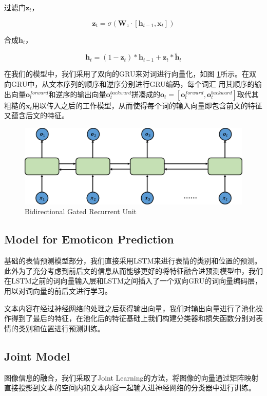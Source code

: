 \documentclass[10pt, titlepage]{article}
\begin{document}
过滤门$\textbf{z}_t$，

$$\textbf{z}_t = \sigma(\textbf{W}_z \cdot [\textbf{h}_{t-1},\textbf{x}_t])$$

合成$\textbf{h}_t$，

$$\textbf{h}_t = (1 - \textbf{z}_t) * \textbf{h}_{t-1} + \textbf{z}_t * \tilde{\textbf{h}}_t$$

在我们的模型中，我们采用了双向的GRU来对词进行向量化，如图 \ref{fig:bi-gru}所示。在双向GRU中，从文本序列的顺序和逆序分别进行GRU编码，每个词汇
用其顺序的输出向量$\textbf{o}^{forward}_t$和逆序的输出向量$\textbf{o}^{backward}_t$拼凑成的$\textbf{o}_t = [\textbf{o}^{forward}_t, \textbf{o}^{backward}_t]$取代其粗糙的$\textbf{x}_t$用以传入之后的工作模型，从而使得每个词的输入向量即包含前文的特征又蕴含后文的特征。

		\begin{figure}[htb]
		\centering
		\includegraphics[width=0.8\columnwidth]{figs/bi-gru.png}
		\caption{Bidirectional Gated Recurrent Unit}
		\label{fig:bi-gru}
		\end{figure}


\subsection{Model for Emoticon Prediction}

基础的表情预测模型部分，我们直接采用LSTM来进行表情的类别和位置的预测。此外为了充分考虑到前后文的信息从而能够更好的将特征融合进预测模型中，我们在LSTM之前的词向量输入层和LSTM之间插入了一个双向GRU的词向量编码层，用以对词向量的前后文进行学习。

文本内容在经过神经网络的处理之后获得输出向量，我们对输出向量进行了池化操作得到了最后的特征，在池化后的特征基础上我们构建分类器和损失函数分别对表情的类别和位置进行预测训练。

\subsection{Joint Model}

图像信息的融合，我们采取了Joint Learning的方法，将图像的向量通过矩阵映射直接投影到文本的空间内和文本内容一起输入进神经网络的分类器中进行训练。
\end{document}
